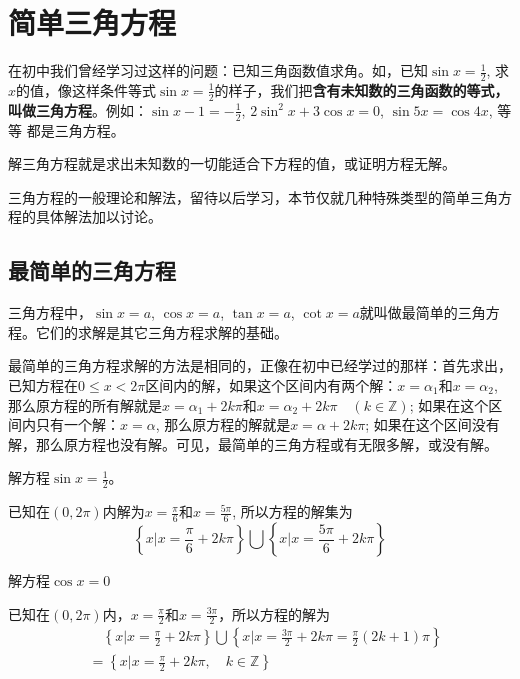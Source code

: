 \section{简单三角方程}
在初中我们曾经学习过这样的问题：已知三角函数值求角。如，已知$\sin x=\frac{1}{2}$, 求$x$的值，像这样条件等式$\sin x=\frac{1}{2}$的样子，我们把\textbf{含有未知数的三角函数的等式，叫做三角方程}。例如：$\sin x-1=-\frac{1}{2}$, 
$2\sin^2x+3\cos x=0$, $\sin5x=\cos4x$, 等等
都是三角方程。

解三角方程就是求出未知数的一切能适合下方程的值，或证明方程无解。

三角方程的一般理论和解法，留待以后学习，本节仅就几种特殊类型的简单三角方程的具体解法加以讨论。

\subsection{最简单的三角方程}

三角方程中，$\sin x=a$,
$\cos x=a$, $\tan x=a$, $\cot x=a$就叫做最简单的三角方程。它们的求解是其它三角方程求解的基础。

最简单的三角方程求解的方法是相同的，正像在初中已经学过的那样：首先求出，已知方程在$0\le x<2\pi$区间内的解，如果这个区间内有两个解：$x=\alpha_1$和$x=\alpha_2$, 那么原方程的所有解就是$x=\alpha_1+2k\pi$和$x=\alpha_2+2k\pi\quad (k\in\mathbb{Z})$; 如果在这个区间内只有一个解：$x=\alpha$, 那么原方程的解就是$x=\alpha+2k\pi$; 如果在这个区间没有解，那么原方程也没有解。可见，最简单的三角方程或有无限多解，或没有解。


\begin{example}
    解方程$\sin x=\frac{1}{2}$。
\end{example}

\begin{solution}
    已知在$(0, 2\pi)$内解为$x=\frac{\pi}{6}$和$x=\frac{5\pi}{6}$,
所以方程的解集为
\[\left\{x\Big|x=\frac{\pi}{6}+2k\pi\right\} \bigcup \left\{x\Big|x=\frac{5\pi}{6}+2k\pi\right\}\]
\end{solution}


\begin{example}
    解方程$\cos x=0$
\end{example}

\begin{solution}
    已知在$(0, 2\pi)$内，$x=\frac{\pi}{2}$和$x=\frac{3\pi}{2}$，所以方程的解为
    \[\begin{split}
 &\quad        \left\{x\Big|x=\frac{\pi}{2}+2k\pi\right\} \bigcup \left\{x\Big|x=\frac{3\pi}{2}+2k\pi=\frac{\pi}{2}(2k+1)\pi\right\}\\
        &=\left\{x\Big|x=\frac{\pi}{2}+2k\pi,\quad k\in\mathbb{Z}\right\} 
    \end{split} \]
\end{solution}


